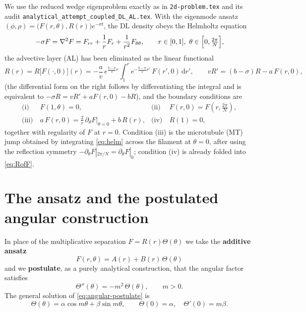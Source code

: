 \documentclass{article}
\newcommand{\rd}{\mathrm{d}}
\begin{document}
We use the reduced wedge eigenproblem exactly as in \texttt{2d-problem.tex} and
its audit \texttt{analytical\_attempt\_coupled\_DL\_AL.tex}. With the eigenmode
ansatz $(\phi,\rho)=\bigl(F(r,\theta),R(r)\bigr)e^{-\sigma t}$, the DL density
obeys the Helmholtz equation
\begin{equation}
-\sigma F=\nabla^{2}F
=F_{rr}+\frac1r F_r+\frac1{r^{2}}F_{\theta\theta},
\qquad r\in[0,1],\ \theta\in\Bigl[0,\tfrac{2\pi}{N}\Bigr],
\label{eq:helm}
\end{equation}
the advective layer (AL) has been eliminated as the linear functional
\begin{equation}
R(r)=R\bigl[F(\cdot,0)\bigr](r)
=-\frac{a}{v}\,e^{\frac{b-\sigma}{v}r}
\int_1^r e^{-\frac{b-\sigma}{v}r'}\,F(r',0)\,\rd r',
\qquad
v R'=(b-\sigma)R-a\,F(r,0),
\label{eq:RofF}
\end{equation}
(the differential form on the right follows by differentiating the integral and
is equivalent to $-\sigma R=vR'+aF(r,0)-bR$), and the boundary conditions are
\begin{align}
\text{(i)}\ & F(1,\theta)=0,
&\text{(ii)}\ & F(r,0)=F\!\left(r,\tfrac{2\pi}{N}\right),
\label{eq:bc12}\\[2pt]
\text{(iii)}\ & a\,F(r,0)=\frac{2}{r}\,\partial_\theta F\big|_{\theta=0}+b\,R(r),
&\text{(iv)}\ & R(1)=0,
\label{eq:bc34}
\end{align}
together with regularity of $F$ at $r=0$. Condition (iii) is the microtubule
(MT) jump obtained by integrating \eqref{eq:helm} across the filament at
$\theta=0$, after using the reflection symmetry
$-\partial_\theta F|_{2\pi/N}=\partial_\theta F|_{0}$; condition (iv) is already
folded into \eqref{eq:RofF}.

\section{The ansatz and the postulated angular construction}

In place of the multiplicative separation $F=R(r)\Theta(\theta)$ we take the
\textbf{additive ansatz}
\begin{equation}
\boxed{\,F(r,\theta)=A(r)+B(r)\,\Theta(\theta)\,}
\label{eq:ansatz}
\end{equation}
and we \textbf{postulate}, as a purely analytical construction, that the angular
factor satisfies
\begin{equation}
\boxed{\,\Theta''(\theta)=-m^{2}\,\Theta(\theta),\qquad m>0.\,}
\label{eq:angular-postulate}
\end{equation}
The general solution of \eqref{eq:angular-postulate} is
\begin{equation}
\Theta(\theta)=\alpha\cos m\theta+\beta\sin m\theta,
\qquad \Theta(0)=\alpha,\quad \Theta'(0)=m\beta .
\label{eq:Theta}
\end{equation}
\end{document}
